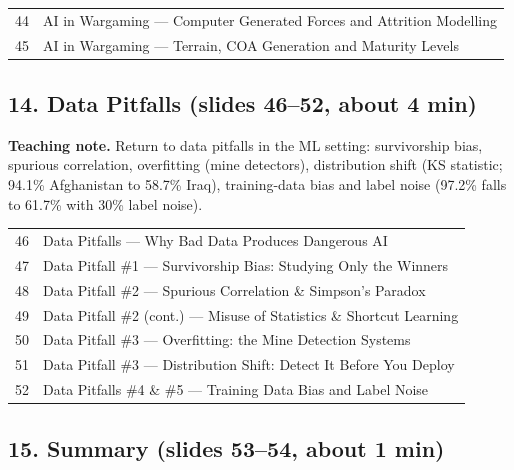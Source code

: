 \documentclass[11pt]{article}
\begin{document}
\begin{center}\small\renewcommand{\arraystretch}{1.1}\begin{tabularx}{\textwidth}{@{}r X@{}}44 & AI in Wargaming --- Computer Generated Forces and Attrition Modelling\\
45 & AI in Wargaming --- Terrain, COA Generation and Maturity Levels\\\end{tabularx}\end{center}

\subsection{14. Data Pitfalls \normalfont\small\color{GreyN}(slides 46--52, about 4 min)}

\textbf{Teaching note.} Return to data pitfalls in the ML setting: survivorship bias, spurious correlation, overfitting (mine detectors), distribution shift (KS statistic; 94.1\% Afghanistan to 58.7\% Iraq), training-data bias and label noise (97.2\% falls to 61.7\% with 30\% label noise).

\begin{center}\small\renewcommand{\arraystretch}{1.1}\begin{tabularx}{\textwidth}{@{}r X@{}}46 & Data Pitfalls --- Why Bad Data Produces Dangerous AI\\
47 & Data Pitfall \#1 --- Survivorship Bias: Studying Only the Winners\\
48 & Data Pitfall \#2 --- Spurious Correlation \& Simpson's Paradox\\
49 & Data Pitfall \#2 (cont.) --- Misuse of Statistics \& Shortcut Learning\\
50 & Data Pitfall \#3 --- Overfitting: the Mine Detection Systems\\
51 & Data Pitfall \#3 --- Distribution Shift: Detect It Before You Deploy\\
52 & Data Pitfalls \#4 \& \#5 --- Training Data Bias and Label Noise\\\end{tabularx}\end{center}

\subsection{15. Summary \normalfont\small\color{GreyN}(slides 53--54, about 1 min)}
\end{document}
